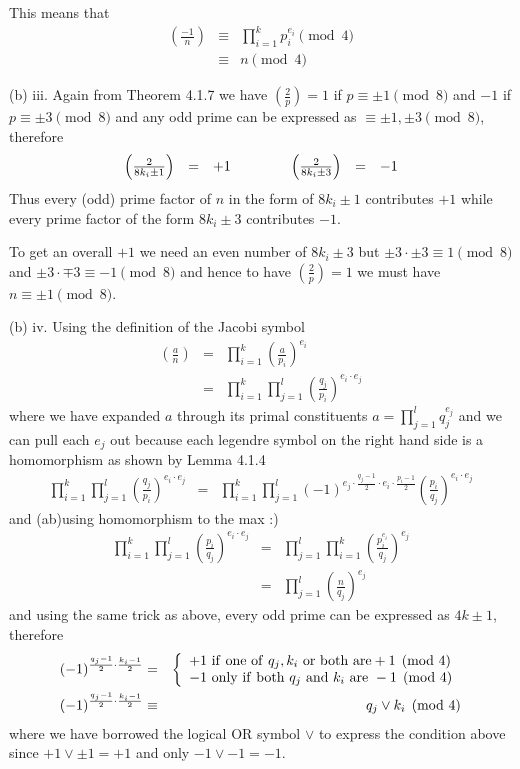 \documentclass[aps,preprint,preprintnumbers,nofootinbib,showpacs,prd]{revtex4-1}
\newcommand{\nbea}{\begin{eqnarray*}}
\newcommand{\neea}{\end{eqnarray*}}
\begin{document}
This means that 
%
\nbea
\left ( \frac{-1}{n}\right ) & \equiv & \prod_{i=1}^k p_i^{e_i} \pmod{4} \\
& \equiv & n \pmod{4}
\neea
%

(b) iii. Again from Theorem 4.1.7 we have $\left ( \frac{2}{p} \right ) = 1$ if $p \equiv \pm 1 \pmod{8}$ and $-1$ if $p \equiv \pm 3 \pmod{8}$ and any odd prime can be expressed as $\equiv \pm 1, \pm 3 \pmod{8}$, therefore
%
\nbea
\begin{array}{r c l c r c l}
\left ( \frac{2}{8k_i\pm1}\right ) & = & +1 & ~~~~~~~ & \left ( \frac{2}{8k_i\pm3}\right ) & = & -1
\end{array}
\neea
%
Thus every (odd) prime factor of $n$ in the form of $8k_i\pm1$ contributes $+1$ while every prime factor of the form $8k_i\pm3$ contributes $-1$.

To get an overall $+1$ we need an even number of $8k_i\pm3$ but $\pm3\cdot\pm3 \equiv 1 \pmod{8}$ and $\pm3\cdot\mp3 \equiv -1 \pmod{8}$ and hence to have $\left ( \frac{2}{p} \right ) = 1$ we must have $n \equiv \pm 1 \pmod{8}$.

(b) iv. Using the definition of the Jacobi symbol
%
\nbea
\left ( \frac{a}{n}\right ) & = & \prod_{i=1}^k \left ( \frac{a}{p_i} \right )^{e_i} \\
& = & \prod_{i=1}^k\prod_{j=1}^l \left ( \frac{q_j}{p_i} \right )^{e_i\cdot e_j} 
\neea
%
where we have expanded $a$ through its primal constituents $a = \prod_{j=1}^l q_j^{e_j}$ and we can pull each $e_j$ out because each legendre symbol on the right hand side is a homomorphism as shown by Lemma 4.1.4
%
\nbea
\prod_{i=1}^k\prod_{j=1}^l \left ( \frac{q_j}{p_i} \right )^{e_i\cdot e_j} & = & \prod_{i=1}^k\prod_{j=1}^l (-1)^{e_j\cdot\frac{q_j-1}{2}\cdot e_i\cdot \frac{p_i-1}{2}} \left ( \frac{p_i}{q_j} \right )^{e_i\cdot e_j} 
\neea
%
and (ab)using homomorphism to the max :)
%
\nbea
\prod_{i=1}^k\prod_{j=1}^l \left ( \frac{p_i}{q_j} \right )^{e_i\cdot e_j} & = & \prod_{j=1}^l \prod_{i=1}^k \left ( \frac{p_i^{e_i}}{q_j} \right )^{e_j} \\
& = & \prod_{j=1}^l \left ( \frac{n}{q_j} \right )^{e_j}
\neea
%
and using the same trick as above, every odd prime can be expressed as $4k\pm1$, therefore
%
\nbea
(-1)^{\frac{q_j-1}{2}\cdot\frac{k_i-1}{2}} & = & \left \{
\begin{array}{l}
+1 {\rm~if~one~of~} q_j, k_i {\rm~or~both~are} +1 \pmod{4} \\
-1 {\rm~only~if~both~} q_j {\rm~and~} k_i {\rm~are~} -1 \pmod{4}  
\end{array}
\right . \\
(-1)^{\frac{q_j-1}{2}\cdot\frac{k_i-1}{2}} & \equiv & q_j \lor k_i \pmod{4}
\neea
%
where we have borrowed the logical OR symbol $\lor$ to express the condition above since $+1 \lor \pm 1 = +1$ and only $-1 \lor -1 = -1$.
\end{document}
